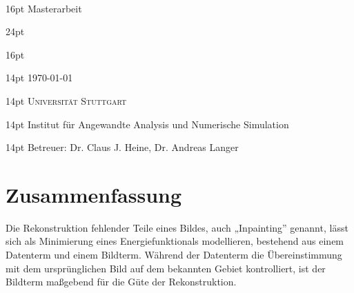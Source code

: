
\begin{titlepage}
    \begin{center}
        ~\par\vspace{4em}
        {
            \fontsize { 16pt } { 16pt } \selectfont
	    Masterarbeit
        }
        \par\vspace{3em}
        {
            \fontsize { 24pt } { 24pt } \selectfont \sffamily \bfseries
            \thetitle
        }
        \par\vspace{3em}
        {
            \fontsize { 16pt } { 16pt } \selectfont \scshape
            \theauthor
        }
        \par\vspace{1.5em}
        {
            \fontsize { 14pt } { 14pt } \selectfont %
            \today
        }
        \par\vspace{4.5em}
        {
        }
        \par\vspace{8em}
        {
            \fontsize { 14pt } { 14pt } \selectfont \scshape
            Universität Stuttgart
        }
        \par\vspace{1em}
        {
            \fontsize { 14pt } { 14pt } \selectfont %
            Institut für Angewandte Analysis und Numerische Simulation
        }
        \par\vspace{1em}
        {
            \fontsize { 14pt } { 14pt } \selectfont %
            Betreuer:
	    Dr. Claus J. Heine,
	    Dr. Andreas Langer
        }
    \end{center}
\end{titlepage}

\chapter*{Zusammenfassung}

Die Rekonstruktion fehlender Teile eines Bildes, auch „Inpainting” genannt, lässt sich als Minimierung eines
Energiefunktionals modellieren, bestehend aus einem Datenterm und einem Bildterm.
Während der Datenterm die Übereinstimmung mit dem ursprünglichen Bild auf dem bekannten Gebiet kontrolliert, ist der Bildterm
maßgebend für die Güte der Rekonstruktion.


{
    \let\clearpage\relax
    \tableofcontents
}

